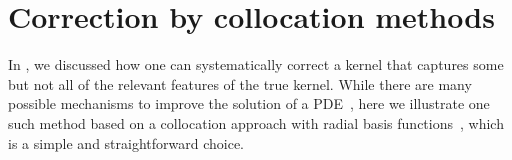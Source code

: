 \documentclass[reprint,amsmath,amssymb,aps,pra,superscriptaddress,nofootinbib,twocolumn,floatfix,nolongbibliography]{revtex4-2}
\begin{document}
\section{Correction by collocation methods}
\label{sec:CollocationDetails}

In , we discussed how one can systematically correct a kernel that captures some but not all of the relevant features of the true kernel. While there are many possible mechanisms to improve the solution of a PDE~\cite{Cavoretto:2020art,Efendiev:2013gma,Chung:2018gqo,Weng:2025dcm,Schaback:2000agt,DeVore:1996gag}, here we illustrate one such method based on a collocation approach with radial basis functions~\cite{Kansa:1990cma,Kansa:1990cmb}, which is a simple and straightforward choice.
\end{document}
